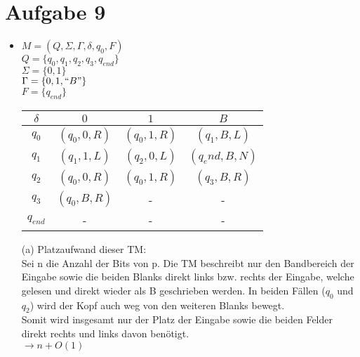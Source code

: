 \documentclass[11pt]{article}
\begin{document}
\section*{Aufgabe 9}

\begin{itemize}
    \item $ M = (Q, \Sigma, \Gamma, \delta, q_0, F) $ \\
        $ Q = \{ q_0, q_1, q_2, q_3, q_{end} \} $ \\
        $ \Sigma = \{0, 1 \} $ \\
        $ \Gamma = \{0, 1,``B"\} $\\
        $ F = \{q_{end}\}$
        
        \begin{table}[h!]
            \centering
             \renewcommand{\arraystretch}{1.33}
             \begin{tabular}{c|ccc}
             
                 $\delta$ & $0$ & $1$ & $B$ \\ \hline
                 $q_0$ & $(q_0, 0, R)$ & $(q_0, 1, R)$ & $(q_1, B, L)$ \\
                 $q_1$ & $(q_1, 1, L)$ & $(q_2, 0, L)$ & $(q_end, B, N)$ \\
                 $q_2$ & $(q_0, 0, R)$ & $(q_0, 1, R)$ & $(q_3, B, R)$ \\
                 $q_3$ & $(q_0, B, R)$ & - & - \\
                 $q_{end}$ & - & - & - \\
             \end{tabular}
         \end{table}


        \item[(a)] Platzaufwand dieser TM:\\
        Sei n die Anzahl der Bits von p. Die TM beschreibt nur den Bandbereich der Eingabe sowie die 
        beiden Blanks direkt links bzw. rechts der Eingabe, welche gelesen und direkt wieder als B geschrieben werden.
        In beiden Fällen ($q_0$ und $q_2$) wird der Kopf auch weg von den weiteren Blanks bewegt.\\
        Somit wird insgesamt nur der Platz der Eingabe sowie die beiden Felder direkt rechts und links davon benötigt.\\
        $\rightarrow n + O(1)$

\end{itemize}
\end{document}

